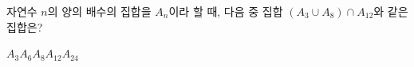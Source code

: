 자연수 $n$의 양의 배수의 집합을 $A_n$이라 할 때, 다음 중 집합 $(A_3\cup A_8)\cap A_{12}$와 같은 집합은?
\begin{choices32}{$A_3$}{$A_6$}{$A_8$}{$A_{12}$}{$A_{24}$}\end{choices32}
